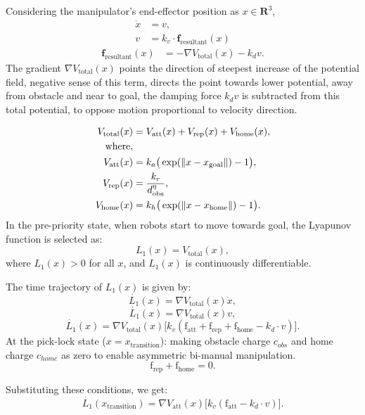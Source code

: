 \documentclass[utf8]{FrontiersinHarvard}
\begin{document}
Considering the manipulator's end-effector position as $x \in\mathbf{R}^3$,
\[
\begin{aligned}
\dot{x} &= v, \\
v &= k_v \cdot \mathbf{{f}}_{\text{resultant}}(x)
\end{aligned}\]
\[\begin{aligned}
\mathbf{{f}}_{\text{resultant}}(x) &= -\nabla V_{\text{total}}(x) - k_{d} v.
\end{aligned}
\]
The gradient $\nabla V_{\text{total}}(x)$ points the direction of steepest increase of the potential field, negative sense of this term, directs the point towards lower potential, away from obstacle and near to goal, the damping force $k_d v$ is subtracted from this total potential, to oppose motion proportional to velocity direction.

\[
\begin{aligned}
V_{\text{total}}(x) &= V_{\text{att}}(x) + V_{\text{rep}}(x) + V_{\text{home}}(x), \\
\noindent \text{where}, \\ 
V_{\text{att}}(x) &= k_a \big(\exp(\|x - x_{\text{goal}}\|) - 1\big), \\
V_{\text{rep}}(x) &= \frac{k_r}{d_{\text{obs}}^{\eta}}, \\
V_{\text{home}}(x) &= k_h \big(\exp(\|x - x_{\text{home}}\|) - 1\big).
\end{aligned}
\]
\noindent In the pre-priority state, when robots start to move towards goal, the Lyapunov function is selected as:
\[
L_{1}(x) = V_{\text{total}}(x),
\]
where $L_{1}(x) > 0$ for all $x$, and $L_{1}(x)$ is continuously differentiable.

The time trajectory of $L_{1}(x)$ is given by:
\[
\dot{L_{1}}(x) = \nabla V_{\text{total}}(x) \dot{x},
\]
\[
\dot{L_{1}}(x) = \nabla V_{\text{total}}(x) v,
\]
\[
\dot{L_{1}}(x) = \nabla V_{\text{total}}(x) \big[k_{v}(\text{f}_{\text{att}} + \text{f}_{\text{rep}} + \text{f}_{\text{home}} - k_{d} \cdot v)\big].
\]
At the pick-lock state ($x = x_{\text{transition}}$):\newline
making obstacle charge $c_{obs}$ and home charge $c_{home}$ as zero to enable asymmetric bi-manual manipulation. 
\[
\text{f}_{\text{rep}} + \text{f}_{\text{home}} = 0.
\]

\noindent Substituting these conditions, we get:
\[
\dot{L_{1}}(x_{\text{transition}}) = \nabla V_{\text{att}}(x) \big[k_{v}(\text{f}_{\text{att}} - k_{d} \cdot v)\big].
\]
\end{document}
